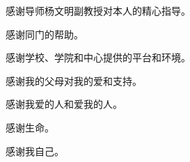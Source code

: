 
\begin{acknowledgements}
  感谢导师杨文明副教授对本人的精心指导。

  感谢同门的帮助。

  感谢学校、学院和中心提供的平台和环境。

  感谢我的父母对我的爱和支持。

  感谢我爱的人和爱我的人。

  感谢生命。

  感谢我自己。



\end{acknowledgements}
